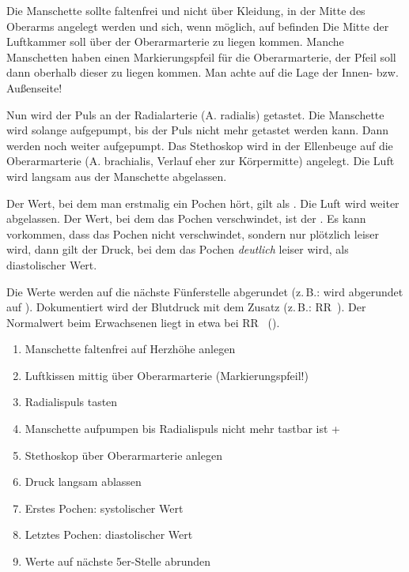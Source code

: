 {%
Die Manschette sollte faltenfrei und nicht über Kleidung, in
der Mitte des Oberarms angelegt werden und sich, wenn
möglich, auf  befinden Die Mitte der Luftkammer soll
über der Oberarmarterie zu liegen kommen. Manche Manschetten
haben einen Markierungspfeil für die Oberarmarterie, der
Pfeil soll dann oberhalb dieser zu liegen kommen. Man achte
auf die Lage der Innen- bzw. Außenseite!

Nun wird der Puls an der Radialarterie (A. radialis)
getastet. Die Manschette wird solange aufgepumpt, bis der
Puls nicht mehr getastet werden kann. Dann werden noch
\MmHg* weiter aufgepumpt. Das Stethoskop wird
in der Ellenbeuge auf die Oberarmarterie (A. brachialis,
Verlauf eher zur Körpermitte) angelegt. Die Luft wird
langsam aus der Manschette abgelassen.

Der Wert, bei dem man erstmalig ein Pochen  hört, gilt als . Die Luft
wird weiter abgelassen. Der Wert, bei dem das Pochen
verschwindet, ist der . Es
kann vorkommen, dass das Pochen nicht verschwindet, sondern
nur plötzlich leiser wird, dann gilt der Druck, bei dem das
Pochen \emph{deutlich} leiser wird, als diastolischer
Wert. \cite{FamPropAeGruFert2012}

Die
Werte werden auf die nächste Fünferstelle abgerundet
(z.\,B.:
 wird abgerundet auf ).
Dokumentiert wird der Blutdruck mit dem Zusatz  (z.\,B.:
RR~). Der Normalwert beim Erwachsenen liegt
in etwa bei RR~
().
}{
\begin{enumerate}
  \item Manschette faltenfrei auf Herzhöhe anlegen
  \item Luftkissen  mittig über Oberarmarterie
  (Markierungspfeil!)
  \item Radialispuls tasten
  \item Manschette aufpumpen bis Radialispuls nicht mehr
  tastbar ist +~\,\MmHg
  \item Stethoskop über Oberarmarterie anlegen
  \item Druck langsam ablassen
  \item Erstes Pochen: systolischer Wert
  \item Letztes Pochen: diastolischer Wert
  \item Werte auf nächste 5er-Stelle abrunden
\end{enumerate}

}{}{}{}



